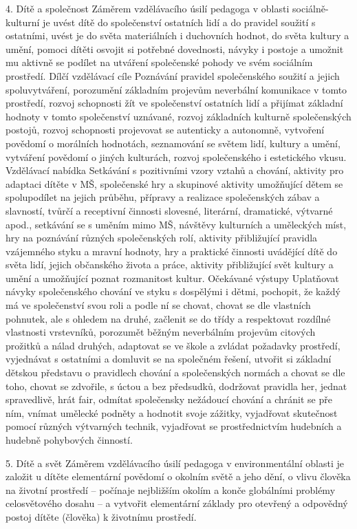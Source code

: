 	4. Dítě a společnost
	Záměrem vzdělávacího úsilí pedagoga v oblasti sociálně-kulturní je uvést dítě do společenství ostatních lidí a do pravidel soužití s ostatními, uvést je do světa materiálních i duchovních hodnot, do světa kultury a umění, pomoci dítěti osvojit si potřebné dovednosti, návyky i postoje a umožnit mu aktivně se podílet na utváření společenské pohody ve svém sociálním prostředí.
	Dílčí vzdělávací cíle
	Poznávání pravidel společenského soužití a jejich spoluvytváření, porozumění základním projevům neverbální komunikace v tomto prostředí, rozvoj schopnosti žít ve společenství ostatních lidí a přijímat základní hodnoty v tomto společenství uznávané, rozvoj základních kulturně společenských postojů, rozvoj schopnosti projevovat se autenticky a autonomně, vytvoření povědomí o morálních hodnotách, seznamování se světem lidí, kultury a umění, vytváření povědomí o jiných kulturách, rozvoj společenského i estetického vkusu.
	Vzdělávací nabídka
	Setkávání s pozitivními vzory vztahů a chování, aktivity pro adaptaci dítěte v MŠ, společenské hry a skupinové aktivity umožňující dětem se spolupodílet na jejich průběhu, přípravy a realizace společenských zábav a slavností, tvůrčí a receptivní činnosti slovesné, literární, dramatické, výtvarné apod., setkávání se s uměním mimo MŠ, návštěvy kulturních a uměleckých míst, hry na poznávání různých společenských  rolí, aktivity přibližující pravidla vzájemného styku a mravní hodnoty, hry a praktické činnosti uvádějící dítě do světa lidí, jejich občanského života a práce, aktivity přibližující svět kultury a umění a umožňující poznat rozmanitost kultur.
	Očekávané výstupy
	Uplatňovat návyky společenského chování ve styku s dospělými i dětmi, pochopit, že každý má ve společenství svou roli a podle ní se chovat, chovat se dle vlastních pohnutek, ale s ohledem na druhé, začlenit se do třídy a respektovat rozdílné vlastnosti vrstevníků, porozumět běžným neverbálním projevům citových prožitků a nálad druhých, adaptovat se ve škole a zvládat požadavky prostředí, vyjednávat s ostatními a domluvit se na společném řešení, utvořit si základní dětskou představu o pravidlech chování a společenských normách a chovat se dle toho, chovat se zdvořile, s úctou a bez předsudků, dodržovat pravidla her, jednat spravedlivě, hrát fair, odmítat společensky nežádoucí chování a chránit se pře ním, vnímat umělecké podněty a hodnotit svoje zážitky, vyjadřovat skutečnost pomocí různých výtvarných technik, vyjadřovat se prostřednictvím hudebních a hudebně pohybových činností.

	5. Dítě a svět
	Záměrem vzdělávacího úsilí pedagoga v environmentální oblasti je založit u dítěte elementární povědomí o okolním světě a jeho dění, o vlivu člověka na životní prostředí – počínaje nejbližším okolím a konče globálními problémy celosvětového dosahu – a vytvořit elementární základy pro otevřený a odpovědný postoj dítěte (člověka) k životnímu prostředí.

